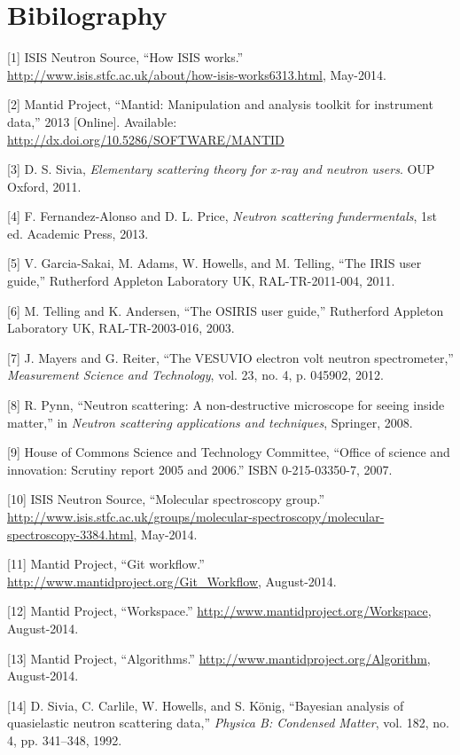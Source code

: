 \documentclass[paper=a4, fontsize=11pt]{scrartcl}	%
\numberwithin{equation}{section}															%
\numberwithin{figure}{section}																%
\numberwithin{table}{section}
\begin{document}
\section*{Bibilography}\label{bibilography}

{[}1{]} ISIS Neutron Source, ``How ISIS works.''
\url{http://www.isis.stfc.ac.uk/about/how-isis-works6313.html},
May-2014.

{[}2{]} Mantid Project, ``Mantid: Manipulation and analysis toolkit for
instrument data,'' 2013 {[}Online{]}. Available:
\url{http://dx.doi.org/10.5286/SOFTWARE/MANTID}

{[}3{]} D. S. Sivia, \emph{Elementary scattering theory for x-ray and
neutron users}. OUP Oxford, 2011.

{[}4{]} F. Fernandez-Alonso and D. L. Price, \emph{Neutron scattering
fundermentals}, 1st ed. Academic Press, 2013.

{[}5{]} V. Garcia-Sakai, M. Adams, W. Howells, and M. Telling, ``The
IRIS user guide,'' Rutherford Appleton Laboratory UK, RAL-TR-2011-004,
2011.

{[}6{]} M. Telling and K. Andersen, ``The OSIRIS user guide,''
Rutherford Appleton Laboratory UK, RAL-TR-2003-016, 2003.

{[}7{]} J. Mayers and G. Reiter, ``The VESUVIO electron volt neutron
spectrometer,'' \emph{Measurement Science and Technology}, vol. 23, no.
4, p. 045902, 2012.

{[}8{]} R. Pynn, ``Neutron scattering: A non-destructive microscope for
seeing inside matter,'' in \emph{Neutron scattering applications and
techniques}, Springer, 2008.

{[}9{]} House of Commons Science and Technology Committee, ``Office of
science and innovation: Scrutiny report 2005 and 2006.'' ISBN
0-215-03350-7, 2007.

{[}10{]} ISIS Neutron Source, ``Molecular spectroscopy group.''
\url{http://www.isis.stfc.ac.uk/groups/molecular-spectroscopy/molecular-spectroscopy-3384.html},
May-2014.

{[}11{]} Mantid Project, ``Git workflow.''
\url{http://www.mantidproject.org/Git_Workflow}, August-2014.

{[}12{]} Mantid Project, ``Workspace.''
\url{http://www.mantidproject.org/Workspace}, August-2014.

{[}13{]} Mantid Project, ``Algorithms.''
\url{http://www.mantidproject.org/Algorithm}, August-2014.

{[}14{]} D. Sivia, C. Carlile, W. Howells, and S. K{ö}nig, ``Bayesian
analysis of quasielastic neutron scattering data,'' \emph{Physica B:
Condensed Matter}, vol. 182, no. 4, pp. 341--348, 1992.
\end{document}
